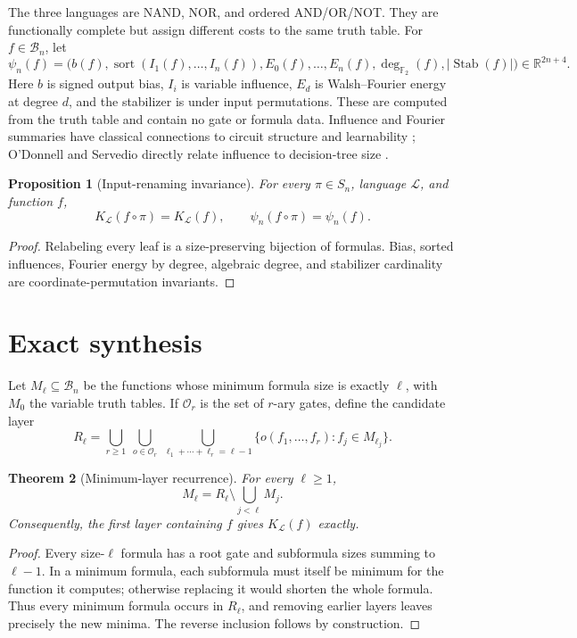 \documentclass[10pt]{article}
\newtheorem{theorem}{Theorem}
\newtheorem{proposition}[theorem]{Proposition}
\theoremstyle{definition}
\begin{document}
The three languages are NAND, NOR, and ordered AND/OR/NOT.  They are
functionally complete but assign different costs to the same truth table.
For $f\in\mathcal B_n$, let
\[
 \psi_n(f)=\bigl(b(f),\operatorname{sort}(I_1(f),\ldots,I_n(f)),
 E_0(f),\ldots,E_n(f),\deg_{\mathbb F_2}(f),|\operatorname{Stab}(f)|\bigr)
 \in\mathbb R^{2n+4}.
 \tag{2}
\]
Here $b$ is signed output bias, $I_i$ is variable influence, $E_d$ is
Walsh--Fourier energy at degree $d$, and the stabilizer is under input
permutations.  These are computed from the truth table and contain no gate or
formula data.  Influence and Fourier summaries have classical connections to
circuit structure and learnability \cite{lmn1993,odonnell2014}; O'Donnell and
Servedio directly relate influence to decision-tree size
\cite{odonnellservedio2007}.

\begin{proposition}[Input-renaming invariance]
For every $\pi\in S_n$, language $\mathcal L$, and function $f$,
\[
 K_{\mathcal L}(f\circ\pi)=K_{\mathcal L}(f),
 \qquad \psi_n(f\circ\pi)=\psi_n(f).
 \tag{3}
\]
\end{proposition}
\begin{proof}
Relabeling every leaf is a size-preserving bijection of formulas.  Bias,
sorted influences, Fourier energy by degree, algebraic degree, and stabilizer
cardinality are coordinate-permutation invariants.
\end{proof}

\section{Exact synthesis}

Let $M_\ell\subseteq\mathcal B_n$ be the functions whose minimum formula size
is exactly $\ell$, with $M_0$ the variable truth tables.  If $\mathcal O_r$ is
the set of $r$-ary gates, define the candidate layer
\[
 R_\ell=\bigcup_{r\ge1}\ \bigcup_{o\in\mathcal O_r}\
 \bigcup_{\ell_1+\cdots+\ell_r=\ell-1}
 \{o(f_1,\ldots,f_r):f_j\in M_{\ell_j}\}.
 \tag{4}
\]

\begin{theorem}[Minimum-layer recurrence]
For every $\ell\ge1$,
\[
 M_\ell=R_\ell\setminus\bigcup_{j<\ell}M_j.
 \tag{5}
\]
Consequently, the first layer containing $f$ gives $K_{\mathcal L}(f)$ exactly.
\end{theorem}
\begin{proof}
Every size-$\ell$ formula has a root gate and subformula sizes summing to
$\ell-1$.  In a minimum formula, each subformula must itself be minimum for
the function it computes; otherwise replacing it would shorten the whole
formula.  Thus every minimum formula occurs in $R_\ell$, and removing earlier
layers leaves precisely the new minima.  The reverse inclusion follows by
construction.
\end{proof}
\end{document}
